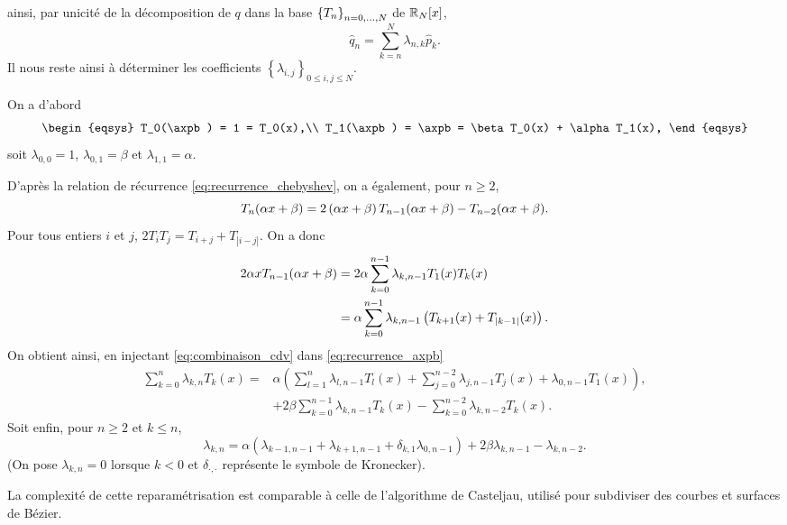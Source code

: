 ainsi, par unicité de la décomposition de $q$ dans la base $\left\{{T}_{n}\right\}_{{n}={0},\ldots,{N}}$ de $\mathbb{R}_{N}[x]$,
\begin{equation}
	\hat{q}_n = \sum_{k=n}^{N} \lambda_{n,k} \hat{p}_k.
\end{equation}
%
Il nous reste ainsi à déterminer les coefficients $\left\{ \lambda_{i,j} \right\}_{0 \leq i,j \leq N}$.
\par\bigskip
On a d'abord
\begin{equation*}
	\begin{eqsys}
		T_0(\axpb) = 1 = T_0(x),\\
		T_1(\axpb) = \axpb = \beta T_0(x) + \alpha T_1(x),
	\end{eqsys}
\end{equation*}
soit $\lambda_{0,0} = 1$, $\lambda_{0,1} = \beta$ et $\lambda_{1,1} = \alpha$.
\par
D'après la relation de récurrence \eqref{eq:recurrence_chebyshev}, on a également, pour $n \geq 2$,
\begin{equation}
	T_n(\alpha x + \beta) =
	2 \left(\alpha x + \beta\right) T_{n-1}(\alpha x + \beta) 
	- T_{n-2}(\alpha x + \beta).
	\label{eq:recurrence_axpb}
\end{equation}
%
Pour tous entiers $i$ et $j$, $2 T_i T_j = T_{i+j} + T_{\left|i - j\right|}$. On a donc%
\begin{align*}
	2 \alpha x T_{n-1}(\alpha x + \beta) &=
	2 \alpha \sum_{k=0}^{n-1} \lambda_{k,n-1} T_1(x) T_k(x) \\
	&= \alpha \sum_{k=0}^{n-1} \lambda_{k,n-1} \left(T_{k+1}(x) + T_{\left|k-1\right|}(x)\right).
\end{align*}
%
On obtient ainsi, en injectant \eqref{eq:combinaison_cdv} dans \eqref{eq:recurrence_axpb}
\begin{align*}
	\sum_{k=0}^{n} \lambda_{k,n} T_k(x) = 
	&\alpha \left(
	\sum_{l=1}^{n} \lambda_{l,n-1} T_l(x) +
	\sum_{j=0}^{n-2} \lambda_{j,n-1} T_j(x) +
	\lambda_{0,n-1} T_1(x)
	\right), \\
	&+ 2 \beta \sum_{k=0}^{n-1} \lambda_{k,n-1} T_k(x)
	- \sum_{k=0}^{n-2} \lambda_{k,n-2} T_k(x).
\end{align*}
%
Soit enfin, pour $n \geq 2$ et $k \leq n$,
\begin{equation}
	\lambda_{k,n} = 
	\alpha \left(
	\lambda_{k-1,n-1} + \lambda_{k+1,n-1} + \delta_{k,1} \lambda_{0,n-1}
	\right)
	+ 2 \beta \lambda_{k,n-1} - \lambda_{k,n-2}.
\end{equation}
(On pose $\lambda_{k,n} = 0$ lorsque $k < 0$ et $\delta_{\cdot,\cdot}$ représente le symbole de Kronecker).\par
%
La complexité de cette reparamétrisation est comparable à celle de l'algorithme de Casteljau, utilisé pour subdiviser des courbes et surfaces de Bézier.